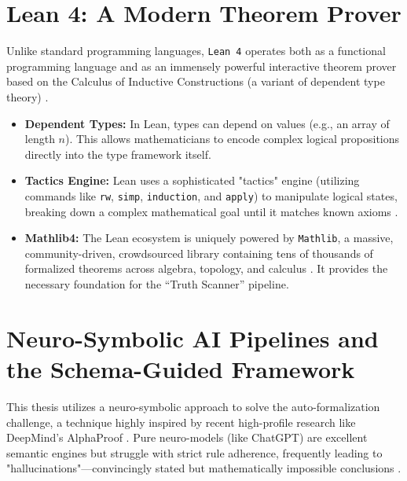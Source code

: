 \section{Lean 4: A Modern Theorem Prover}
Unlike standard programming languages, \texttt{Lean 4} operates both as a functional programming language and as an immensely powerful interactive theorem prover based on the Calculus of Inductive Constructions (a variant of dependent type theory) \cite{lean4_doc}. 
\begin{itemize}
    \item \textbf{Dependent Types:} In Lean, types can depend on values (e.g., an array of length $n$). This allows mathematicians to encode complex logical propositions directly into the type framework itself.
    \item \textbf{Tactics Engine:} Lean uses a sophisticated "tactics" engine (utilizing commands like \texttt{rw}, \texttt{simp}, \texttt{induction}, and \texttt{apply}) to manipulate logical states, breaking down a complex mathematical goal until it matches known axioms \cite{lean_tactics}.
    \item \textbf{Mathlib4:} The Lean ecosystem is uniquely powered by \texttt{Mathlib}, a massive, community-driven, crowdsourced library containing tens of thousands of formalized theorems across algebra, topology, and calculus \cite{mathlib, lean4_doc}. It provides the necessary foundation for the ``Truth Scanner'' pipeline.
\end{itemize}

\section{Neuro-Symbolic AI Pipelines and the Schema-Guided Framework}
This thesis utilizes a neuro-symbolic approach to solve the auto-formalization challenge, a technique highly inspired by recent high-profile research like DeepMind's AlphaProof \cite{alphaproof2024, neural_formal}. Pure neuro-models (like ChatGPT) are excellent semantic engines but struggle with strict rule adherence, frequently leading to "hallucinations"—convincingly stated but mathematically impossible conclusions \cite{llm_hallucination, proof_systems}.

